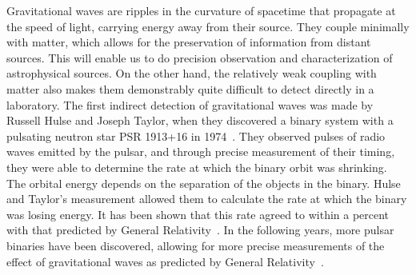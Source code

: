 \newcommand{\FILL}{\textcolor{red}{FILLME}}



Gravitational waves
are ripples in the curvature of spacetime that propagate at the speed of light,
% 
% 
carrying energy away from their source. They couple 
minimally with matter, which allows for the preservation of information from 
distant sources. This will enable us to do precision observation and 
characterization of astrophysical sources. 
On the other hand, the relatively weak coupling with matter also makes them
demonstrably quite difficult to detect directly in a laboratory.
The first indirect detection of gravitational waves was made by Russell Hulse 
and Joseph Taylor, when they discovered a binary system with a pulsating neutron
star PSR 1913+16 in 1974~\cite{hulse}. They observed pulses of radio waves
emitted by the pulsar, and through precise measurement of their timing,
they were able to determine the rate at which the binary orbit was shrinking.
The orbital energy depends on the separation of the objects in 
the binary. Hulse and Taylor's
measurement allowed them to calculate the rate at which the binary 
was losing energy. It has been shown that this rate agreed to within a percent
with that predicted by General Relativity~\cite{Weisberg:1981mt,Taylor:1989}.
In the following years, more pulsar binaries
have been discovered, allowing for more precise measurements of the effect
of gravitational waves as predicted by General Relativity~\cite{Burgay:2003jj}.


